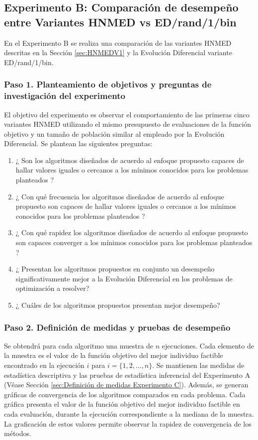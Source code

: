 \subsection{Experimento B: Comparación de desempeño entre Variantes HNMED vs ED/rand/1/bin}
En el Experimento B se realiza una comparación de las variantes HNMED descritas en la Sección \ref{sec:HNMEDV1} y la Evolución Diferencial variante  ED/rand/1/bin.
\subsubsection{Paso 1. Planteamiento de objetivos y preguntas de investigación del experimento}
El objetivo del experimento es observar el comportamiento de las primeras cinco variantes HNMED utilizando el mismo presupuesto de evaluaciones de la función objetivo y un tamaño de población similar al empleado por la Evolución Diferencial. Se plantean las siguientes preguntas:
\begin{enumerate}
	\item ¿ Son los algoritmos diseñados de acuerdo al enfoque propuesto capaces de hallar valores iguales o cercanos a los mínimos conocidos para los problemas planteados ?
	\item ¿ Con qué frecuencia los algoritmos diseñados de acuerdo al enfoque propuesto son capaces de hallar valores iguales o cercanos a  los mínimos conocidos para los problemas planteados ?
	\item ¿ Con qué rapidez los algoritmos diseñados de acuerdo al enfoque propuesto son capaces converger a los mínimos conocidos para los problemas planteados ?
	\item ¿ Presentan los algoritmos propuestos en conjunto un desempeño significativamente mejor a la Evolución Diferencial en los problemas de optimización a resolver?
	\item ¿ Cuáles de los algoritmos propuestos presentan mejor desempeño?
\end{enumerate}
\subsubsection{Paso 2. Definición de medidas y pruebas de desempeño}
Se obtendrá para cada algoritmo una muestra de $n$ ejecuciones. Cada elemento de la muestra es el valor de la función objetivo del mejor individuo factible encontrado en la ejecución $i$ para $i= \{ 1,2,...,n\}$. Se mantienen las medidas de estadística descriptiva y las pruebas de estadística inferencial del Experimento A (Véase Sección \ref{sec:Definición de medidas Experimento C}). Además, se generan gráficas de convergencia de los algoritmos comparados en cada problema. Cada gráfica presenta el valor de la función objetivo del mejor individuo factible en cada evaluación, durante la ejecución correspondiente a la mediana de la muestra. La graficación de estos valores permite observar la rapidez de convergencia de los métodos.

